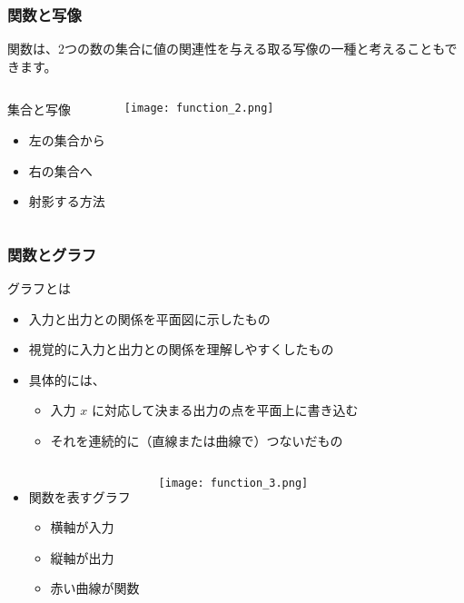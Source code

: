 \documentclass[12pt, dvipdfmx]{beamer}
\begin{document}
\begin{frame}
	\frametitle{関数と写像}
	関数は、2つの数の集合に値の関連性を与える取る写像の一種と考えることもできます。
	\begin{columns}[T, onlytextwidth]
			\begin{block}{集合と写像}
				\begin{itemize}
					\item 左の集合から
					\item 右の集合へ
					\item 射影する方法
				\end{itemize}
			\end{block}
		\begin{center}
			\texttt{[image: function\_2.png]}
			\end{center}
	\end{columns}
\end{frame}

\begin{frame}
	\frametitle{関数とグラフ}
	\begin{block}{グラフとは}
		\begin{itemize}
			\item \alert{入力と出力との関係を平面図}に示したもの
			\item 視覚的に入力と出力との関係を理解しやすくしたもの
			\item 具体的には、
			\begin{itemize}
				\item 入力 $x$ に対応して決まる出力の点を平面上に書き込む
				\item それを連続的に（直線または曲線で）つないだもの
			\end{itemize}
		\end{itemize}
	\end{block}
	\begin{columns}[T, onlytextwidth]
			\begin{itemize}
				\item 関数を表すグラフ
				\begin{itemize}
					\item 横軸が入力
					\item 縦軸が出力
					\item 赤い曲線が関数
				\end{itemize}
			\end{itemize}
			\vspace{-5mm}
			\begin{center}
			\texttt{[image: function\_3.png]}
			\end{center}
	\end{columns}
\end{frame}
	
\end{document}
